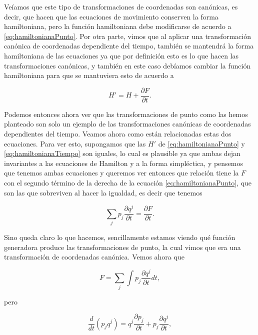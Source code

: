 \documentclass[a4paper,10pt]{article}
\numberwithin{equation}{section}
\begin{document}
Veíamos que este tipo de transformaciones de coordenadas son canónicas, es decir, 
que hacen que las ecuaciones de movimiento conserven la forma hamiltoniana, pero 
la función hamiltoniana debe modificarse de acuerdo a \eqref{eq:hamiltonianaPunto}. 
Por otra parte, vimos que al aplicar una transformación canónica de coordenadas dependiente 
del tiempo, también se mantendrá la forma hamiltoniana de las ecuaciones ya que por 
definición esto es lo que hacen las transformaciones canónicas, y también en este 
caso debíamos cambiar la función hamiltoniana para que se mantuviera esto de acuerdo 
a 

\begin{equation}
 H' = H + \frac{\partial F}{\partial t}.
 \label{eq:hamiltonianaTiempo}
\end{equation}

Podemos entonces ahora ver que las transformaciones de punto como las hemos planteado 
son solo un ejemplo de las transformaciones canónicas de coordenadas dependientes 
del tiempo. Veamos ahora como están relacionadas estas dos ecuaciones. Para ver esto, 
supongamos que las $H'$ de \eqref{eq:hamiltonianaPunto} y \eqref{eq:hamiltonianaTiempo} 
son iguales, lo cual es plausible ya que ambas dejan invariantes a las ecuaciones 
de Hamilton y a la forma simpléctica, y pensemos que tenemos ambas ecuaciones 
y queremos ver entonces que relación tiene la $F$ con el segundo término de la 
derecha de la ecuación \eqref{eq:hamiltonianaPunto}, que son las que sobreviven 
al hacer la igualdad, es decir que tenemos 

\begin{equation}
 \sum_j p_j \frac{\partial q^j}{\partial t} = \frac{\partial F}{\partial t}.
\end{equation}

Sino queda claro lo que hacemos, sencillamente estamos viendo qué función generadora 
produce las transformaciones de punto, la cual vimos que era una transformación de 
coordenadas canónica. Vemos ahora que 

\begin{equation}
 F = \sum_j \int p_j \frac{\partial q^j}{\partial t}dt,
\end{equation}

pero 

\begin{equation}
 \frac{d}{dt}(p_jq^j) = q^j\frac{\partial p_j}{\partial t} +
 p_j\frac{\partial q^j}{\partial t},
\end{equation}
\end{document}

